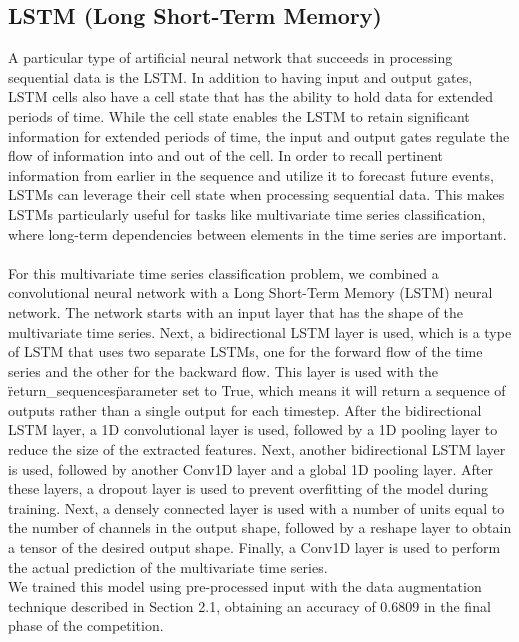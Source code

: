 \documentclass[11pt, oneside]{article}
\begin{document}
\subsection{LSTM (Long Short-Term Memory)}
A particular type of artificial neural network that succeeds in processing sequential data is the LSTM. In addition to having input and output gates, LSTM cells also have a cell state that has the ability to hold data for extended periods of time. While the cell state enables the LSTM to retain significant information for extended periods of time, the input and output gates regulate the flow of information into and out of the cell. In order to recall pertinent information from earlier in the sequence and utilize it to forecast future events, LSTMs can leverage their cell state when processing sequential data. This makes LSTMs particularly useful for tasks like multivariate time series classification, where long-term dependencies between elements in the time series are important.\\\\
For this multivariate time series classification problem, we combined a convolutional neural network with a Long Short-Term Memory (LSTM) neural network.
The network starts with an input layer that has the shape of the multivariate time series. Next, a bidirectional LSTM layer is used, which is a type of LSTM that uses two separate LSTMs, one for the forward flow of the time series and the other for the backward flow. This layer is used with the \"return\_sequences\" parameter set to True, which means it will return a sequence of outputs rather than a single output for each timestep.
After the bidirectional LSTM layer, a 1D convolutional layer is used, followed by a 1D pooling layer to reduce the size of the extracted features. Next, another bidirectional LSTM layer is used, followed by another Conv1D layer and a global 1D pooling layer.
After these layers, a dropout layer is used to prevent overfitting of the model during training. Next, a densely connected layer is used with a number of units equal to the number of channels in the output shape, followed by a reshape layer to obtain a tensor of the desired output shape. Finally, a Conv1D layer is used to perform the actual prediction of the multivariate time series.\\
We trained this model using pre-processed input with the data augmentation technique described in Section 2.1, obtaining an accuracy of 0.6809 in the final phase of the competition.
\end{document}
